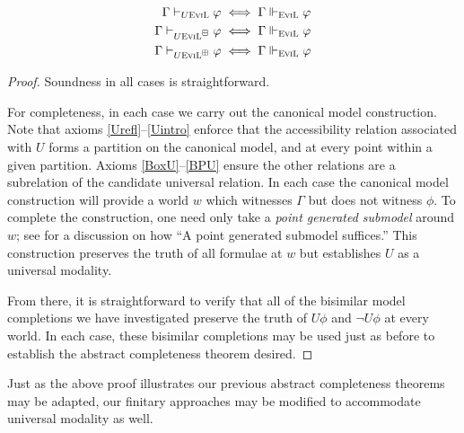 \begin{theorem}\label{universal-completeness}\ \\
\begin{align*}
\Gamma \vdash_{U\textup{\textsc{EviL}}} \varphi & \iff \Gamma\Vdash_{\textup{\textsc{EviL}}}
\varphi \\
\Gamma \vdash_{U\textup{\textsc{EviL}$^\boxminus$}} \varphi & \iff \Gamma\Vdash_{\textup{\textsc{EviL}}}
\varphi \\
\Gamma \vdash_{U\textup{\textsc{EviL}}^\boxplus} \varphi & \iff \Gamma\Vdash_{\textup{\textsc{EviL}}}
\varphi 
\end{align*}
\end{theorem}
\begin{proof}
Soundness in all cases is straightforward.

For completeness, in each case we carry out the canonical model
construction.
Note that axioms \ref{Urefl}--\ref{Uintro} enforce 
that the accessibility relation associated with $U$ forms
a partition on the canonical model, and at every point within a
given partition.  Axioms \ref{BoxU}--\ref{BPU} ensure the other relations are a subrelation of the
candidate universal relation.  In each case the canonical model construction will
provide a world $w$ which witnesses $\Gamma$ but does not witness
$\phi$.  To complete the construction, one need only take a \emph{point
  generated submodel} around $w$; see \cite[chapter
2, pg. 210]{blackburn_modal_2001} for a discussion on how ``A point
generated submodel suffices.''
This construction preserves the truth of all formulae at $w$ but 
establishes $U$ as a universal modality.

From there, it is straightforward to verify that all of the bisimilar
model completions we have investigated preserve the truth of $U \phi$
and $\neg U \phi$ at every world.
In each case, these bisimilar completions may be used just as before to establish the
abstract completeness theorem desired.
\end{proof}

Just as the above proof illustrates our previous abstract completeness
theorems may be adapted, our finitary approaches may be modified to
accommodate universal modality as well.

